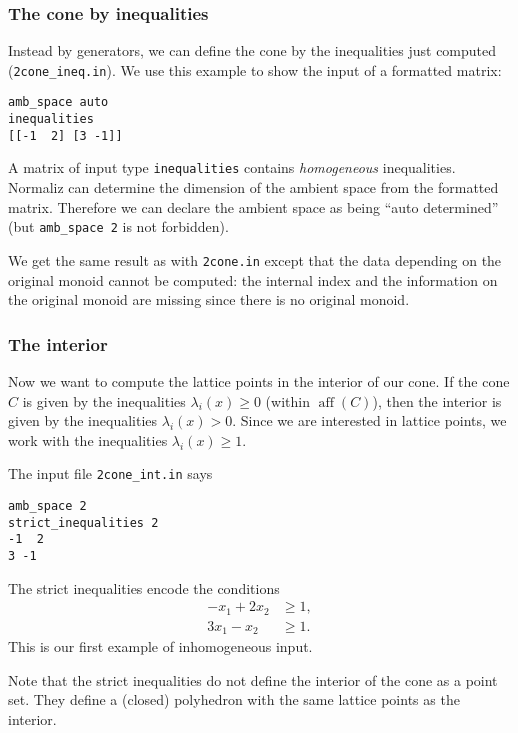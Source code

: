 \documentclass[12pt,a4paper]{scrartcl}
\theoremstyle{definition}
\DeclareMathOperator{\aff}{aff}
\begin{document}
\subsubsection{The cone by inequalities}\label{ineq_ex}

Instead by generators, we can define the cone by the inequalities just computed (\verb|2cone_ineq.in|). We use this example to show the input of a formatted matrix:
\begin{Verbatim}
amb_space auto
inequalities
[[-1  2] [3 -1]]
\end{Verbatim}
A matrix of input type \verb|inequalities| contains \emph{homogeneous} inequalities. Normaliz can determine the dimension of the ambient space from the formatted matrix. Therefore we can declare the ambient space as being ``auto determined'' (but \verb|amb_space 2| is not forbidden).

We get the same result as with \verb|2cone.in| except that the data depending on the original monoid cannot be computed: the internal index and the information on the original monoid are missing since there is no original monoid.

\subsubsection{The interior}\label{strict_ex}
Now we want to compute the lattice points in the interior of our cone. If the cone $C$ is given by the inequalities $\lambda_i(x)\ge0$ (within $\aff(C)$), then the interior is given by the inequalities $\lambda_i(x)>0$. Since we are interested in lattice points, we work with the inequalities $\lambda_i(x)\ge 1$.


The input file \verb|2cone_int.in| says
\begin{Verbatim}
amb_space 2
strict_inequalities 2
-1  2
3 -1
\end{Verbatim}
The strict inequalities encode the conditions
\begin{align*}
	-x_1+2x_2&\ge 1,\\
	3x_1-x_2&\ge 1.
\end{align*}
This is our first example of inhomogeneous input.

Note that the strict inequalities do not define the interior of the cone as a point set. They define a (closed) polyhedron with the same lattice points as the interior.
\end{document}
